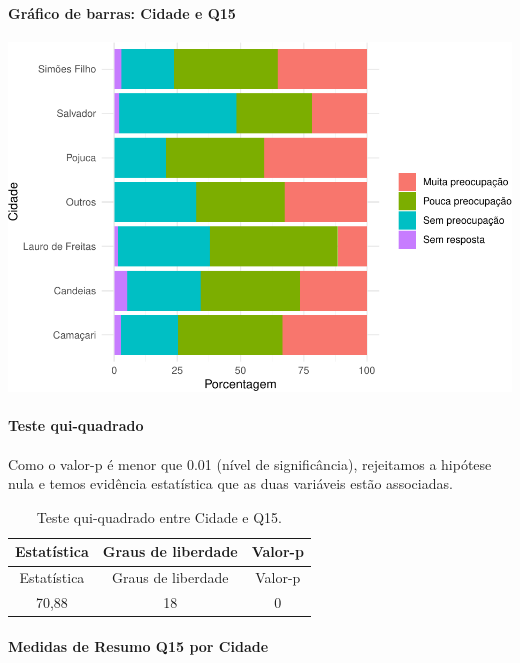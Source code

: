 \documentclass[]{article}
\let\oldparagraph\paragraph
\renewcommand{\paragraph}[1]{\oldparagraph{#1}\mbox{}}
\begin{document}
\hypertarget{gruxe1fico-de-barras-cidade-e-q15}{%
\paragraph{Gráfico de barras: Cidade e Q15}\label{gruxe1fico-de-barras-cidade-e-q15}}

\begin{center}\includegraphics[width=0.75\linewidth]{relatorio_covid19_files/figure-latex/unnamed-chunk-72-1} \end{center}

\hypertarget{teste-qui-quadrado-7}{%
\paragraph{Teste qui-quadrado}\label{teste-qui-quadrado-7}}

Como o valor-p é menor que 0.01 (nível de significância), rejeitamos a hipótese nula e temos evidência estatística que as duas variáveis estão associadas.

\begin{longtable}[]{@{}ccc@{}}
\caption{\label{tab:unnamed-chunk-74}Teste qui-quadrado entre Cidade e Q15.}\tabularnewline
\toprule
Estatística & Graus de liberdade & Valor-p\tabularnewline
\midrule
\endfirsthead
\toprule
Estatística & Graus de liberdade & Valor-p\tabularnewline
\midrule
\endhead
70,88 & 18 & 0\tabularnewline
\bottomrule
\end{longtable}

\cleardoublepage

\hypertarget{medidas-de-resumo-q15-por-cidade}{%
\paragraph{Medidas de Resumo Q15 por Cidade}\label{medidas-de-resumo-q15-por-cidade}}
\end{document}

